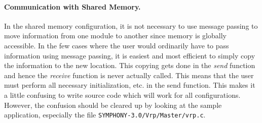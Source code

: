 \paragraph{Communication with Shared Memory.}
\label{shared}
In the shared memory configuration, it is not necessary to use
message passing to move information from one module to another since
memory is globally accessible. In the few cases where the user would
ordinarily have to pass information using message passing, it is
easiest and most efficient to simply copy the information to the new
location. This copying gets done in the {\em send} function and hence
the {\em receive} function is never actually called. This means that
the user must perform all necessary initialization, etc. in the send
function. This makes it a little confusing to write source code which
will work for all configurations. However, the confusion should be
cleared up by looking at the sample application, especially the file
{\tt SYMPHONY-3.0/Vrp/Master/vrp.c}.

